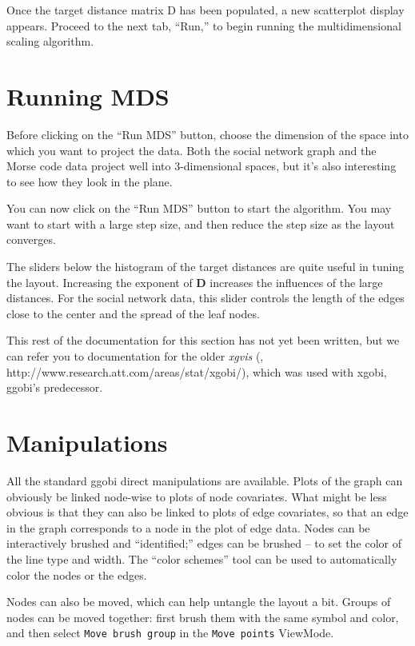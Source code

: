 \documentclass[11pt]{article}
\begin{document}
Once the target distance matrix D has been populated, a new
scatterplot display appears.  Proceed to the next tab, ``Run,''
to begin running the multidimensional scaling algorithm.

\section{Running MDS}

Before clicking on the ``Run MDS'' button, choose the dimension
of the space into which you want to project the data.  Both the
social network graph and the Morse code data project well into
3-dimensional spaces, but it's also interesting to see how they
look in the plane.

You can now click on the ``Run MDS'' button to start the
algorithm.  You may want to start with a large step size, and
then reduce the step size as the layout converges.

The sliders below the histogram of the target distances are quite
useful in tuning the layout.  Increasing the exponent of {\bf D}
increases the influences of the large distances.  For the social
network data, this slider controls the length of the edges close to
the center and the spread of the leaf nodes.

This rest of the documentation for this section has not yet been
written, but we can refer you to documentation for the older {\em
xgvis} (\cite{xgvis_jcgs2002},
http://www.research.att.com/areas/stat/xgobi/), which was used with
xgobi, ggobi's predecessor.

\section{Manipulations}

All the standard ggobi direct manipulations are available.  Plots of
the graph can obviously be linked node-wise to plots of node covariates.
What might be less obvious is that they can also be linked to plots of
edge covariates, so that an edge in the graph corresponds to a node in the
plot of edge data.  Nodes can be interactively brushed and ``identified;''
edges can be brushed -- to set the color of the line type and width.
The ``color schemes'' tool can be used to automatically color the nodes
or the edges.

Nodes can also be moved, which can help untangle the layout a bit.
Groups of nodes can be moved together: first brush them with
the same symbol and color, and then select {\tt Move brush group}
in the {\tt Move points} ViewMode.
\end{document}
